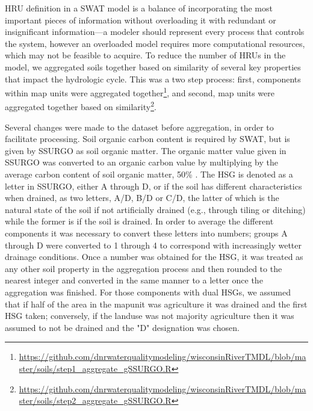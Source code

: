 {HRU definition in a SWAT model is a balance of incorporating the most important
pieces of information without overloading it with redundant or insignificant
information---a modeler should represent every process that controls the system,
however an overloaded model requires more computational resources, which may not
be feasible to acquire. To reduce the number of HRUs in the model, we aggregated
soils together based on similarity of several key properties that impact the
hydrologic cycle. This was a two step process: first, components within map
units were aggregated
together\footnote{\url{https://github.com/dnrwaterqualitymodeling/wisconsinRiverTMDL/blob/master/soils/step1_aggregate_gSSURGO.R}},
and second, map units were aggregated together based on
similarity\footnote{\url{https://github.com/dnrwaterqualitymodeling/wisconsinRiverTMDL/blob/master/soils/step2_aggregate_gSSURGO.R}}.

Several changes were made to the dataset before aggregation, in order to
facilitate processing. Soil organic carbon content is required by SWAT, but is
given by SSURGO as soil organic matter. The organic matter value given in SSURGO
was converted to an organic carbon value by multiplying by the average carbon
content of soil organic matter, 50\% \citep{brady_elements_2004}. The HSG is
denoted as a letter in SSURGO, either A through D, or if the soil has different
characteristics when drained, as two letters, A/D, B/D or C/D, the latter of
which is the natural state of the soil if not artificially drained (e.g.,
through tiling or ditching) while the former is if the soil is drained. In order
to average the different components it was necessary to convert these letters
into numbers; groups A through D were converted to 1 through 4 to correspond
with increasingly wetter drainage conditions. Once a number was obtained for the
HSG, it was treated as any other soil property in the aggregation process and
then rounded to the nearest integer and converted in the same manner to a letter
once the aggregation was finished. For those components with dual HSGs, we
assumed that if half of the area in the mapunit was agriculture it was drained
and the first HSG taken; conversely, if the landuse was not majority agriculture
then it was assumed to not be drained and the "D" designation was chosen.

}
